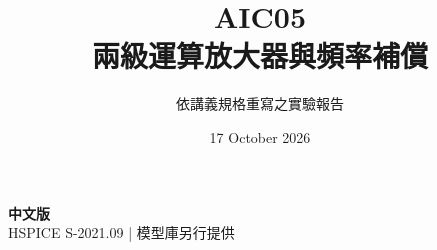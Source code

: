 \documentclass[11pt,a4paper]{article}
\title{\color{accent}AIC05\\[4pt]兩級運算放大器與頻率補償}
\author{依講義規格重寫之實驗報告}
\date{17 October 2026}
\begin{document}
\maketitle
\begin{center}\small\textbf{中文版}\\
HSPICE S-2021.09 \quad | \quad 模型庫另行提供
\end{center}


\end{document}
